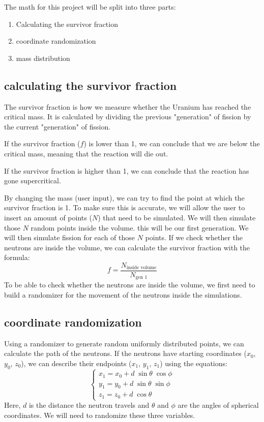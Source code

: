The math for this project will be split into three parts:
\begin{enumerate}
	\item Calculating the survivor fraction
	\item coordinate randomization
	\item mass distribution 
\end{enumerate}
\subsection{calculating the survivor fraction}
The survivor fraction is how we measure whether the Uranium has reached the critical mass. It is calculated by dividing the previous "generation" of fission by the current "generation" of fission. 

If the survivor fraction ($f$) is lower than 1, we can conclude that we are below the critical mass, meaning that the reaction will die out.

If the survivor fraction is higher than 1, we can conclude that the reaction has gone supercritical.

By changing the mass (user input), we can try to find the point at which the survivor fraction is 1. To make sure this is accurate, we will allow the user to insert an amount of points ($N$) that need to be simulated. We will then simulate those $N$ random points inside the volume. this will be our first generation. We will then simulate fission for each of those $N$ points. If we check whether the neutrons are inside the volume, we can calculate the survivor fraction with the formula:
\begin{equation}
	f=\frac{N_{\text{inside volume}}}{N_{\text{gen 1}}}
\end{equation}
To be able to check whether the neutrons are inside the volume, we first need to build a randomizer for the movement of the neutrons inside the simulations.
\subsection{coordinate randomization}\label{randomizer}
Using a randomizer to generate random uniformly distributed points, we can calculate the path of the neutrons. If the neutrons have starting coordinates ($x_0$, $y_0$, $z_0$), we can describe their endpoints ($x_1$, $y_1$, $z_1$) using the equations:
\begin{equation}
	\begin{cases}
		x_1= x_0+d\;\sin\theta\;\cos\phi \\
		y_1=y_0+d\;\sin\theta\;\sin\phi \\
		z_1=z_0+d\;\cos\theta
	\end{cases} \label{newcoords}
\end{equation}
Here, $d$ is the distance the neutron travels and $\theta$ and $\phi$ are the angles of spherical coordinates. We will need to randomize these three variables.

